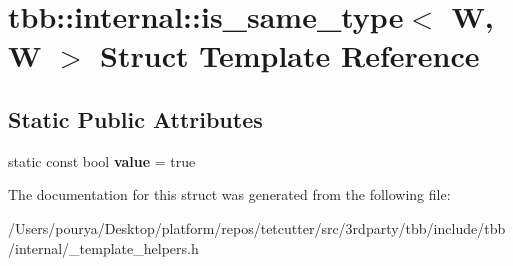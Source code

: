 \hypertarget{structtbb_1_1internal_1_1is__same__type_3_01W_00_01W_01_4}{}\section{tbb\+:\+:internal\+:\+:is\+\_\+same\+\_\+type$<$ W, W $>$ Struct Template Reference}
\label{structtbb_1_1internal_1_1is__same__type_3_01W_00_01W_01_4}
\subsection*{Static Public Attributes}
\begin{DoxyCompactItemize}
\item 
\hypertarget{structtbb_1_1internal_1_1is__same__type_3_01W_00_01W_01_4_afe1c5a981a5c4f7bd78b0e5c9cc0152b}{}static const bool {\bfseries value} = true\label{structtbb_1_1internal_1_1is__same__type_3_01W_00_01W_01_4_afe1c5a981a5c4f7bd78b0e5c9cc0152b}

\end{DoxyCompactItemize}


The documentation for this struct was generated from the following file\+:\begin{DoxyCompactItemize}
\item 
/\+Users/pourya/\+Desktop/platform/repos/tetcutter/src/3rdparty/tbb/include/tbb/internal/\+\_\+template\+\_\+helpers.\+h\end{DoxyCompactItemize}
